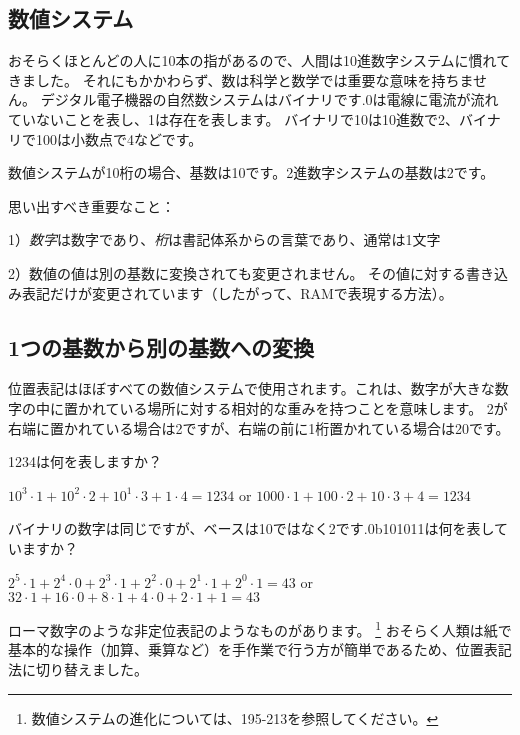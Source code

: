 \subsection{数値システム}

おそらくほとんどの人に10本の指があるので、人間は10進数字システムに慣れてきました。 それにもかかわらず、数は科学と数学では重要な意味を持ちません。 デジタル電子機器の自然数システムはバイナリです.0は電線に電流が流れていないことを表し、1は存在を表します。 バイナリで10は10進数で2、バイナリで100は小数点で4などです。

数値システムが10桁の場合、基数は10です。2進数字システムの基数は2です。

思い出すべき重要なこと：

1）\emph{数字}は数字であり、\emph{桁}は書記体系からの言葉であり、通常は1文字

2）数値の値は別の基数に変換されても変更されません。 その値に対する書き込み表記だけが変更されています（したがって、\ac{RAM}で表現する方法）。

\subsection{1つの基数から別の基数への変換}

位置表記はほぼすべての数値システムで使用されます。これは、数字が大きな数字の中に置かれている場所に対する相対的な重みを持つことを意味します。
2が右端に置かれている場合は2ですが、右端の前に1桁置かれている場合は20です。

1234は何を表しますか？

$10^3 \cdot 1 + 10^2 \cdot 2 + 10^1 \cdot 3 + 1 \cdot 4 = 1234$ or
$1000 \cdot 1 + 100 \cdot 2 + 10 \cdot 3 + 4 = 1234$

バイナリの数字は同じですが、ベースは10ではなく2です.0b101011は何を表していますか？

$2^5 \cdot 1 + 2^4 \cdot 0 + 2^3 \cdot 1 + 2^2 \cdot 0 + 2^1 \cdot 1 + 2^0 \cdot 1 = 43$ or
$32 \cdot 1 + 16 \cdot 0 + 8 \cdot 1 + 4 \cdot 0 + 2 \cdot 1 + 1 = 43$

ローマ数字のような非定位表記のようなものがあります。
\footnote{数値システムの進化については、195-213を参照してください。}
おそらく人類は紙で基本的な操作（加算、乗算など）を手作業で行う方が簡単であるため、位置表記法に切り替えました。

